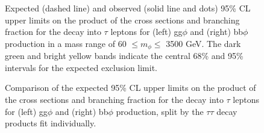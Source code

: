 \begin{figure}[!hbtp]
\centering
\caption{Expected (dashed line) and observed (solid line and dots) 95\% CL upper limits on the product of the cross sections and branching fraction for the decay into $\tau$ leptons for (left) gg$\phi$ and (right) bb$\phi$ production in a mass range of 60 $\leq m_{\phi} \leq$ 3500 GeV.  The dark green and bright yellow bands indicate the central 68\% and 95\% intervals for the expected exclusion limit.}
\label{fig:model_independent_limits}
\end{figure}

\begin{figure}[!hbtp]
\centering
\caption{Comparison of the expected 95\% CL upper limits on the product of the cross sections and branching fraction for the decay into $\tau$ leptons for (left) gg$\phi$ and (right) bb$\phi$ production, split by the $\tau\tau$ decay products fit individually.}
\label{fig:model_independent_limits_by_channel}
\end{figure}

